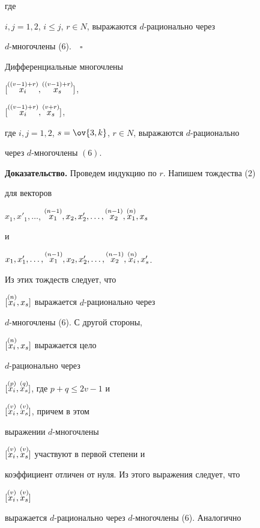 где


$i,j=1,2$, $i\le j$, $r\in N$, выражаются $d$-рационально через 


$d$-многочлены (6).$\quad\square$





\begin{lem}


Дифференциальные многочлены


$[\overset{((v-1)+r)}{x_i}{},\overset{((v-1)+r)}{x_s}{}]$,


$[\overset{((v-1)+r)}{x_i}{},\overset{(v+r)}{x_s}{}]$,


где $i,j=1,2$, $s=\ov{3,k}$, $r\in N$, выражаются $d$-рационально


через $d$-многочлены $(6)$.


\end{lem}





{\bf Доказательство.} Проведем индукцию по $r$. Напишем тождества (2) 


для векторов




$x_1,x'_1,\dotsc$, $\up{(n-1)}{x_1},x_2,x'_2,\dotsc,


\up{(n-1)}{x_2},\up{(n)}{x_1},x_s$


и


$x_1,x'_1,\dotsc,\up{(n-1)}{x_1},x_2,x'_2,\dotsc,


\up{(n-1)}{x_2},\up{(n)}{x_i},x'_s$.


Из этих тождеств следует, что


$[\overset{(n)}{x_i}{},x_s]$ выражается $d$-рационально через 


$d$-многочлены (6). С другой стороны,


$[\overset{(n)}{x_i}{},x_s]$ выражается цело 


$d$-рационально через


$[\overset{(p)}{x_i}{},\overset{(q)}{x_s}{}]$, где $p+q\le2v-1$ и


$[\overset{(v)}{x_i}{},\overset{(v)}{x_s}{}]$, причем в этом


выражении $d$-многочлены


$[\overset{(v)}{x_i}{},\overset{(v)}{x_s}{}]$ участвуют в первой степени и


коэффициент отличен от нуля. Из этого выражения следует, что


$[\overset{(v)}{x_i}{},\overset{(v)}{x_s}{}]$


выражается $d$-рационально через $d$-многочлены (6). Аналогично


